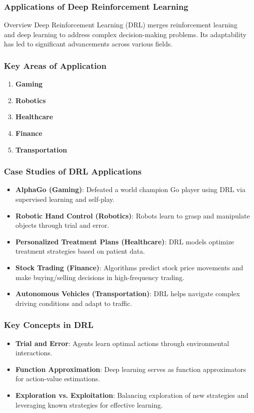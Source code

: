 \documentclass[aspectratio=169]{beamer}
\begin{document}
\begin{frame}[fragile]
    \frametitle{Applications of Deep Reinforcement Learning}
    \begin{block}{Overview}
        Deep Reinforcement Learning (DRL) merges reinforcement learning and deep learning to address complex decision-making problems. Its adaptability has led to significant advancements across various fields.
    \end{block}
\end{frame}

\begin{frame}[fragile]
    \frametitle{Key Areas of Application}
    \begin{enumerate}
        \item \textbf{Gaming}
        \item \textbf{Robotics}
        \item \textbf{Healthcare}
        \item \textbf{Finance}
        \item \textbf{Transportation}
    \end{enumerate}
\end{frame}

\begin{frame}[fragile]
    \frametitle{Case Studies of DRL Applications}
    \begin{itemize}
        \item \textbf{AlphaGo (Gaming)}: Defeated a world champion Go player using DRL via supervised learning and self-play.
        \item \textbf{Robotic Hand Control (Robotics)}: Robots learn to grasp and manipulate objects through trial and error.
        \item \textbf{Personalized Treatment Plans (Healthcare)}: DRL models optimize treatment strategies based on patient data.
        \item \textbf{Stock Trading (Finance)}: Algorithms predict stock price movements and make buying/selling decisions in high-frequency trading.
        \item \textbf{Autonomous Vehicles (Transportation)}: DRL helps navigate complex driving conditions and adapt to traffic.
    \end{itemize}
\end{frame}

\begin{frame}[fragile]
    \frametitle{Key Concepts in DRL}
    \begin{itemize}
        \item \textbf{Trial and Error}: Agents learn optimal actions through environmental interactions.
        \item \textbf{Function Approximation}: Deep learning serves as function approximators for action-value estimations.
        \item \textbf{Exploration vs. Exploitation}: Balancing exploration of new strategies and leveraging known strategies for effective learning.
    \end{itemize}
\end{frame}
\end{document}
